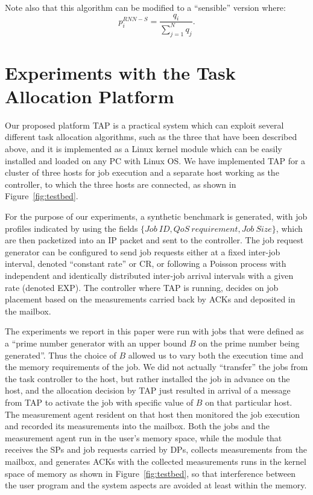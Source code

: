 \documentclass[journal]{IEEEtran}
\begin{document}
Note also that this algorithm can be modified to a ``sensible'' version where:
\begin{equation}
p_i^{RNN-S}=\frac{q_i}{\sum_{j=1}^Nq_j}. \label{RNN-S}
\end{equation}





\section{Experiments with the Task Allocation Platform}
\label{experimentalresults}

Our proposed platform TAP is a practical system which can exploit several different task allocation algorithms, such as the three that have been described above, and
it is implemented as a Linux kernel module which can be easily installed and loaded on any PC with Linux OS.
We have implemented TAP for a cluster of three hosts for job execution and a separate host working as the controller, to which the three hosts are connected, as shown in Figure~\ref{fig:testbed}. 

For the purpose of our experiments, a synthetic benchmark is generated, with job profiles indicated  by using the  fields $\{Job~ID, QoS~requirement,Job~Size\}$, which are then packetized into an IP packet and sent to the controller. The job request generator can be configured to send job requests either at a fixed inter-job interval, denoted ``constant rate'' or CR, or following a Poisson process with independent and identically distributed
inter-job arrival intervals with a given rate (denoted EXP).  The controller where TAP is running, decides on job placement based on the measurements carried back by ACKs and deposited in the mailbox. 

The experiments we report in this paper were run with jobs that were defined as a ``prime number generator with an upper bound $B$ on the prime number being generated''. Thus the choice of $B$ allowed us to vary both
the execution time and the memory requirements of the job. We did not actually ``transfer'' the jobs from the task controller to the host, but rather installed the job in advance on the host,
and the allocation decision by TAP just resulted in arrival of a message from TAP to activate the job with specific value of $B$ on that particular host. 
The measurement agent resident on that host then monitored the job execution and recorded its measurements into the mailbox. Both the jobs and the measurement agent run in the user's memory space,
while  the module that receives the SPs and job requests carried by DPs, collects measurements from the mailbox, and generates ACKs with the collected measurements runs in the kernel space of memory as shown in Figure~\ref{fig:testbed}, so that interference between the user program and the system aspects are avoided at least within the memory. 
\end{document}
